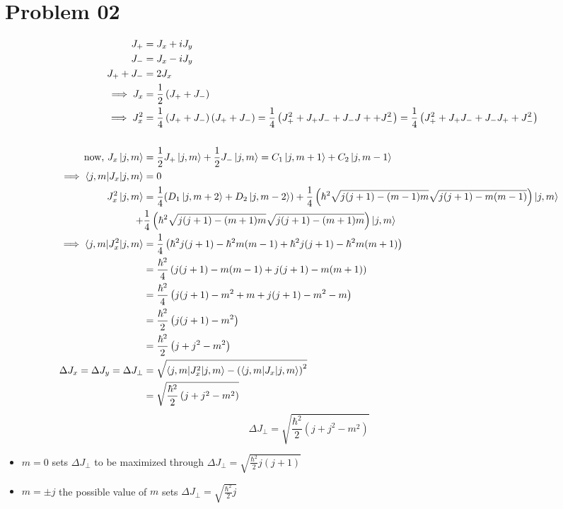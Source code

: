 \documentclass[letter, 10pts]{article}
\newcommand{\hb}{\hbar}
\begin{document}
\newpage
\section*{Problem 02} 
\begin{align*}
J_+ &= J_x + i J_y  \\
J_- &= J_x - i J_y \\ 
J_+ + J_- &= 2 J_x \\
\implies J_x &= \frac{1}{2} \left(J_+ + J_-\right) \\
\implies J_x^2 &= \frac{1}{4} \left(J_+ + J_-\right) \left(J_+ + J_-\right)  
= \frac{1}{4} \left(
J_+^{2} + J_+ J_- + J_- J+ + J_-^2
\right) 
= \frac{1}{4} \left(
J_+^{2} + J_+ J_- + J_- J_+ + J_-^2
\right)  \\ 
\
\\
\text{now, } 
J_x \ket{j,m} &= \frac{1}{2} J_+ \ket{j,m} + \frac{1}{2} J_- \ket{j,m} 
=
C_1 \ket{j, m+1} + C_2 \ket{j, m-1} \\ \implies
\braket{j,m | J_x | j,m } &= 0 \\
J_x^2 \ket{j,m} &= \frac{1}{4} (D_1 \ket{j, m+2} + D_2 \ket{j, m-2})
+ \frac{1}{4}
\left(
\hb^2 
\sqrt{j(j+1) - (m-1)m} 
\sqrt{j(j+1) - m(m-1)} 
\right) \ket{j, m} 
\\ 
+& 
\frac{1}{4} 
\left(
\hb ^2 
\sqrt{j(j+1) - (m+1)m} 
\sqrt{j(j+1) - (m+1)m} 
\right) \ket{j,m}
\\\implies
\braket{j,m | J_x^2  | j,m} 
&=  \frac{1}{4} 
\left(
\hb^2 j(j+1) - \hb ^2 m(m-1)  
+ \hb^2 j(j+1) - \hb ^2 m (m+1)
\right)\\
&=  \frac{\hb^2}{4} 
\left(
 j(j+1) -  m(m-1)  
+ j(j+1) - m (m+1)
\right)\\
&=  \frac{\hb^2}{4} 
\left(
 j(j+1) -  m^2 + m 
+ j(j+1) - m^2 - m 
\right)\\
&=  \frac{\hb^2}{2} 
\left(
 j(j+1) -  m^2  
\right)\\
&=  \frac{\hb^2}{2} 
\left(
 j + j^2 -  m^2  
\right)\\
\Delta J_x = \Delta J_y = \Delta J_\perp 
&= 
\sqrt{
\braket{j,m | J_x^2 | j,m} -
\left(
\braket{j,m | J_x | j,m }
\right)^2
} 
\\ 
&= 
\sqrt{
\frac{\hb^2}{2}
\left(j + j ^2 - m ^2 \right)
} 
\\
\end{align*}
\[
\boxed{
\Delta J_\perp = 
\sqrt{\frac{\hb^2}{2} (j+j^2-m^2)} 
}
\] 
\begin{itemize}
	\item $ m = 0$ sets $\Delta J_\perp$ to be maximized through $\Delta J_\perp = \sqrt{ \frac{\hb^2}{2} j (j + 1)} $ 
	\item $m = \pm j$ the possible value of $m$ sets $\Delta J_\perp = \sqrt{\frac{\hb^2}{2} j} $
\end{itemize}
\end{document}

